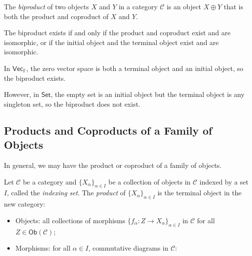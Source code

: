 \documentclass[
	11pt, %
	fleqn, %
	a4paper, %
]{LegrandOrangeBook}
\newcommand{\F}{\mathbb{F}} %
\newcommand{\C}{\mathcal{C}} %
\newcommand{\Set}{\boldsymbol{\mathsf{Set}}} %
\newcommand{\Vect}{\boldsymbol{\mathsf{Vec}}} %
\newcommand{\Ob}[1]{\mathsf{Ob}(#1)} %
\begin{document}
\begin{definition}[Biproducts]
    The \emph{biproduct} of two objects $X$ and $Y$ in a category $\C$ is an object $X \oplus Y$ that is both the product and coproduct of $X$ and $Y$.
\end{definition}
\begin{remark}
    The biproduct exists if and only if the product and coproduct exist and are isomorphic, or if the initial object and the terminal object exist and are isomorphic.
\end{remark}

\begin{example}
    In $\Vect_{\F}$, the zero vector space is both a terminal object and an initial object, so the biproduct exists.
\end{example}

However, in $\Set$, the empty set is an initial object but the terminal object is any singleton set, so the biproduct does not exist.

\subsection{Products and Coproducts of a Family of Objects}

In general, we may have the product or coproduct of a family of objects.

Let $\C$ be a category and $\{ X_{\alpha} \}_{\alpha \in I}$ be a collection of objects in $\C$ indexed by a set $I$, called the \emph{indexing set}. The \emph{product} of $\{ X_{\alpha} \}_{\alpha \in I}$ is the terminal object in the new category:
\begin{itemize}
    \item Objects: all collections of morphisms $\{ f_{\alpha} : Z \to X_{\alpha} \}_{\alpha \in I}$ in $\C$ for all $Z \in \Ob{\C}$;
    \item Morphisms: for all $\alpha \in I$, commutative diagrams in $\C$:
\end{itemize}
\begin{center}
\end{center}
\end{document}
